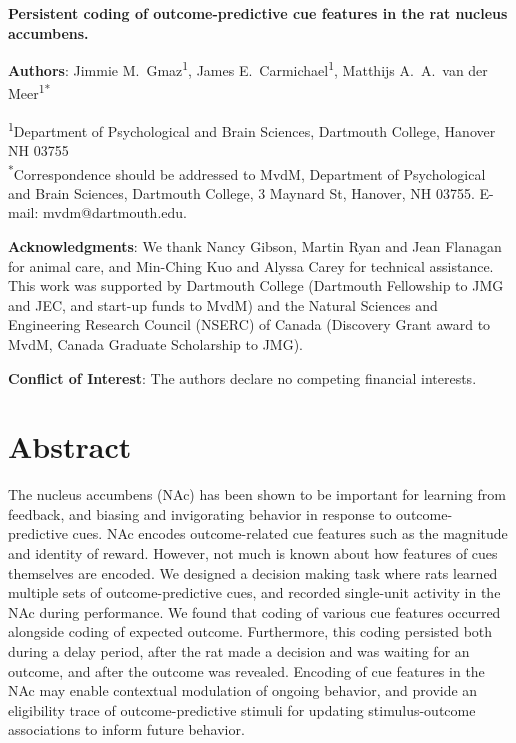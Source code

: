 \documentclass[11pt]{article}
\begin{document}
\renewcommand{\BBAB}{\BBAA}

{\Large\bf Persistent coding of outcome-predictive cue features in the
  rat nucleus accumbens.}

{\bf Authors}: Jimmie M.\ Gmaz\textsuperscript{1}, James
E.\ Carmichael\textsuperscript{1}, Matthijs A.\ A.\ van der
Meer\textsuperscript{1*}

\textsuperscript{1}Department of Psychological and Brain Sciences,
Dartmouth College, Hanover NH
03755\\ 

\textsuperscript{*}Correspondence should be addressed to MvdM,
Department of Psychological and Brain Sciences, Dartmouth College, 3
Maynard St, Hanover, NH 03755. E-mail: {\sffamily mvdm@dartmouth.edu}.

\textbf{Acknowledgments}: We thank Nancy Gibson, Martin Ryan and Jean
Flanagan for animal care, and Min-Ching Kuo and
Alyssa Carey for technical assistance. This work was supported by
Dartmouth College (Dartmouth Fellowship to JMG and JEC, and start-up funds to
MvdM) and the Natural Sciences and Engineering Research Council
(NSERC) of Canada (Discovery Grant award to MvdM, Canada Graduate
Scholarship to JMG).

\textbf{Conflict of Interest}: The authors declare no competing
financial interests.\\

\newpage
\linenumbers

\section*{Abstract}

The nucleus accumbens (NAc) has been shown to be important for
learning from feedback, and biasing and invigorating behavior in
response to outcome-predictive cues. NAc encodes outcome-related cue
features such as the magnitude and identity of reward. However, not
much is known about how features of cues themselves are encoded.  We
designed a decision making task where rats learned multiple sets of
outcome-predictive cues, and recorded single-unit activity in the NAc
during performance. We found that coding of various cue features
occurred alongside coding of expected outcome. Furthermore, this
coding persisted both during a delay period, after the rat made a decision
and was waiting for an outcome, and after the outcome was
revealed. Encoding of cue features in the NAc may enable contextual
modulation of ongoing behavior, and provide an eligibility trace of
outcome-predictive stimuli for updating stimulus-outcome associations
to inform future behavior.
\end{document}
